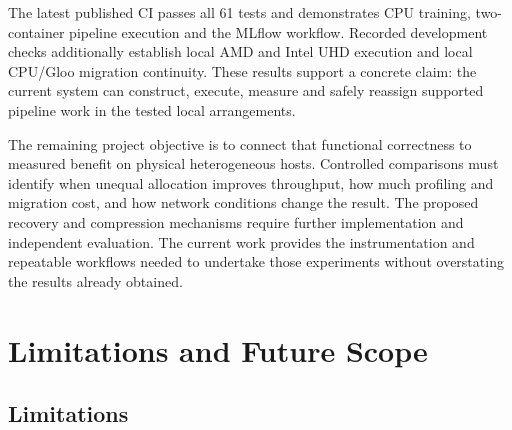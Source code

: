 The latest published CI passes all 61 tests and demonstrates CPU training, two-container pipeline execution and the MLflow workflow. Recorded development checks additionally establish local AMD and Intel UHD execution and local CPU/Gloo migration continuity. These results support a concrete claim: the current system can construct, execute, measure and safely reassign supported pipeline work in the tested local arrangements.

The remaining project objective is to connect that functional correctness to measured benefit on physical heterogeneous hosts. Controlled comparisons must identify when unequal allocation improves throughput, how much profiling and migration cost, and how network conditions change the result. The proposed recovery and compression mechanisms require further implementation and independent evaluation. The current work provides the instrumentation and repeatable workflows needed to undertake those experiments without overstating the results already obtained.

\section{Limitations and Future Scope}

\subsection{Limitations}

